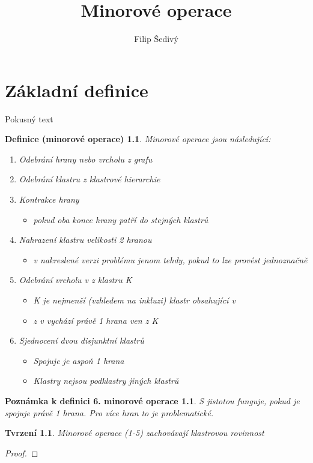 \documentclass[12pt,a4report]{report}
\title {Minorové operace}
\newtheorem{def1}{Definice (minorové operace)}
\newtheorem{poz1}{Poznámka k definici 6. minorové operace}
\newtheorem{tvr1}{Tvrzení}
\begin{document}
\author{Filip Šedivý}
\maketitle

\chapter{Základní definice}

Pokusný text

\begin{def1}
Minorové operace jsou následující:
\begin{enumerate}
\item Odebrání hrany nebo vrcholu z grafu
\item Odebrání klastru z klastrové hierarchie
\item Kontrakce hrany
\begin{itemize}
\item  pokud oba konce hrany patří do stejných klastrů
\end{itemize}
\item Nahrazení klastru velikosti 2 hranou
\begin{itemize}
\item  v nakreslené verzi problému jenom tehdy, pokud to lze provést jednoznačně
\end{itemize}
\item Odebrání vrcholu v z klastru K
\begin{itemize}
\item  K je nejmenší (vzhledem na inkluzi) klastr obsahující v
\item z v vychází právě 1 hrana ven z K 
\end{itemize}
\item Sjednocení dvou disjunktní klastrů
\begin{itemize}
\item  Spojuje je aspoň 1 hrana
\item Klastry nejsou podklastry jiných klastrů
\end{itemize}
\end{enumerate}
\end{def1}

\begin{poz1}
S jistotou funguje, pokud je spojuje právě 1 hrana. Pro více hran to je problematické.
\end{poz1}

\begin{tvr1}
Minorové operace (1-5) zachovávají klastrovou rovinnost
\end{tvr1}
\begin{proof}
\end{proof}
\end{document}
